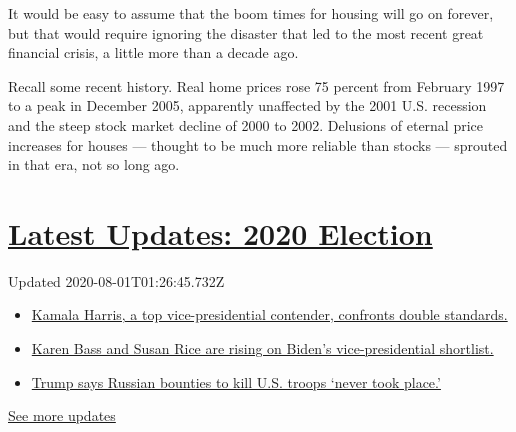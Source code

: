 It would be easy to assume that the boom times for housing will go on
forever, but that would require ignoring the disaster that led to the
most recent great financial crisis, a little more than a decade ago.

Recall some recent history. Real home prices rose 75 percent from
February 1997 to a peak in December 2005, apparently unaffected by the
2001 U.S. recession and the steep stock market decline of 2000 to 2002.
Delusions of eternal price increases for houses --- thought to be much
more reliable than stocks --- sprouted in that era, not so long ago.

\hypertarget{latest-updates-2020-election}{%
\section{\texorpdfstring{\href{https://www.nytimes.com/2020/07/31/us/elections/biden-vs-trump.html?action=click\&pgtype=Article\&state=default\&region=MAIN_CONTENT_1\&context=storylines_live_updates}{Latest
Updates: 2020
Election}}{Latest Updates: 2020 Election}}\label{latest-updates-2020-election}}

Updated 2020-08-01T01:26:45.732Z

\begin{itemize}
\tightlist
\item
  \href{https://www.nytimes.com/2020/07/31/us/elections/biden-vs-trump.html?action=click\&pgtype=Article\&state=default\&region=MAIN_CONTENT_1\&context=storylines_live_updates\#link-29fdff45}{Kamala
  Harris, a top vice-presidential contender, confronts double
  standards.}
\item
  \href{https://www.nytimes.com/2020/07/31/us/elections/biden-vs-trump.html?action=click\&pgtype=Article\&state=default\&region=MAIN_CONTENT_1\&context=storylines_live_updates\#link-13ec3d9c}{Karen
  Bass and Susan Rice are rising on Biden's vice-presidential
  shortlist.}
\item
  \href{https://www.nytimes.com/2020/07/31/us/elections/biden-vs-trump.html?action=click\&pgtype=Article\&state=default\&region=MAIN_CONTENT_1\&context=storylines_live_updates\#link-49e9a016}{Trump
  says Russian bounties to kill U.S. troops `never took place.'}
\end{itemize}

\href{https://www.nytimes.com/2020/07/31/us/elections/biden-vs-trump.html?action=click\&pgtype=Article\&state=default\&region=MAIN_CONTENT_1\&context=storylines_live_updates}{See
more updates}

